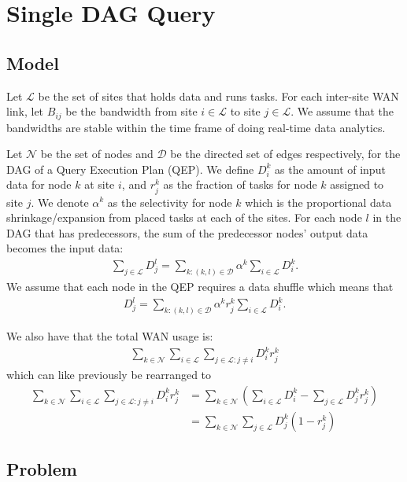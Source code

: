 \section{Single DAG Query}

\subsection{Model}

Let $\mathcal{L}$ be the set of sites that holds data and runs tasks.
For each inter-site WAN link, let $B_{ij}$ be the bandwidth from site $i\in\mathcal{L}$ to site $j\in\mathcal{L}$.
We assume that the bandwidths are stable within the time frame of doing real-time data analytics.

Let $\mathcal{N}$ be the set of nodes and $\mathcal{D}$ be the directed set of edges respectively, for the DAG of a Query Execution Plan (QEP).
We define $D_i^k$ as the amount of input data for node $k$ at site $i$, and $r_j^k$ as the fraction of tasks for node $k$ assigned to site $j$.
We denote $\alpha^k$ as the selectivity for node $k$ which is the proportional data shrinkage/expansion from placed tasks at each of the sites.
For each node $l$ in the DAG that has predecessors, the sum of the predecessor nodes' output data becomes the input data: 
\begin{align}
	\sum_{j\in\mathcal{L}}D_j^l = \sum_{k:(k,l)\in\mathcal{D}}\alpha^k\sum_{i\in\mathcal{L}}D_i^k.
\end{align}
We assume that each node in the QEP requires a data shuffle which means that
\begin{align}
	D_j^l = \sum_{k:(k,l)\in\mathcal{D}}\alpha^kr_j^k\sum_{i\in\mathcal{L}}D_i^k.
\end{align}

We also have that the total WAN usage is:
\begin{align}
	\sum_{k\in\mathcal{N}}\sum_{i\in\mathcal{L}}\sum_{j\in\mathcal{L}:j\neq i}D_i^kr_j^k
\end{align}
which can like previously be rearranged to
\begin{align}
	\sum_{k\in\mathcal{N}}\sum_{i\in\mathcal{L}}\sum_{j\in\mathcal{L}:j\neq i}D_i^kr_j^k & = \sum_{k\in\mathcal{N}}\left(\sum_{i\in\mathcal{L}}D_i^k - \sum_{j\in\mathcal{L}}D_j^kr_j^k\right) \\
	& =\sum_{k\in\mathcal{N}}\sum_{j\in\mathcal{L}}D_j^k(1-r_j^k)
\end{align}

\subsection{Problem}

